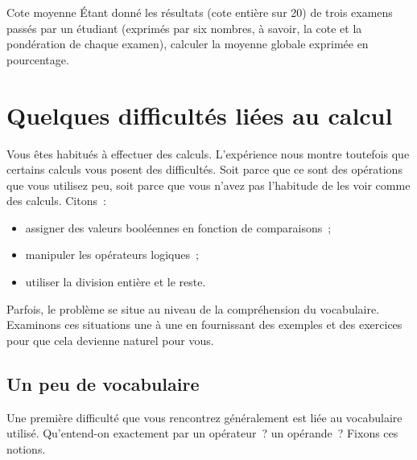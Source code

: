 			\begin{Exercice}{Cote moyenne}
				Étant donné les résultats (cote entière sur
				20) de trois examens passés par un étudiant (exprimés par six nombres,
				à savoir, la cote et la pondération de chaque examen), calculer 
				la moyenne globale exprimée en pourcentage.
			\end{Exercice}
	
	\section{Quelques difficultés liées au calcul}
	
		Vous êtes habitués à effectuer des calculs.
		L’expérience nous montre toutefois que certains calculs
		vous posent des difficultés.
		Soit parce que ce sont des opérations que vous utilisez peu,
		soit parce que vous n’avez pas l’habitude de les voir comme des
		calculs.
		Citons~: 
		\begin{itemize}
		\item
			assigner des valeurs booléennes 
			en fonction de comparaisons~;
		\item
			manipuler les opérateurs logiques~;
		\item
			utiliser la division entière et le reste.
		\end{itemize}
		
		Parfois, le problème se situe au niveau de la compréhension du vocabulaire.
		Examinons ces situations une à une
		en fournissant des exemples et des exercices
		pour que cela devienne naturel pour vous.

		\subsection{Un peu de vocabulaire}

			Une première difficulté que vous rencontrez généralement 
			est liée au vocabulaire utilisé. 
			Qu’entend-on exactement par un opérateur~? un opérande~? 
			Fixons ces notions.
			
